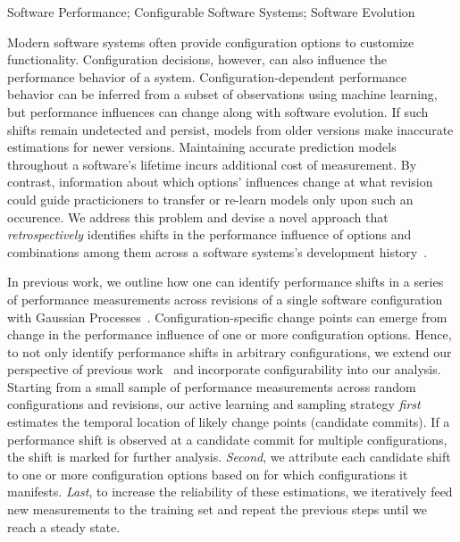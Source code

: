 \documentclass[utf8,biblatex]{lni}
\begin{document}
\begin{keywords}
Software Performance; Configurable Software Systems; Software Evolution
\end{keywords}

Modern software systems often provide configuration options to customize functionality. Configuration decisions, however, can also influence the performance behavior of a system. Configuration-dependent performance behavior can be inferred from a subset of observations using machine learning, but performance influences can change along with software evolution. If such shifts remain undetected and persist, models from older versions make inaccurate estimations for newer versions. Maintaining accurate prediction models throughout a software's lifetime incurs additional cost of measurement. By contrast, information about which options' influences change at what revision could guide practicioners to transfer or re-learn models only upon such an occurence. 
We address this problem and devise a novel approach that \textit{retrospectively} identifies shifts in the performance influence of options and combinations among them across a software systems’s development history~\cite{muehlbauer_identifying_2020}. 

In previous work, we outline how one can identify performance shifts in a series of performance measurements across revisions of a single software configuration with Gaussian Processes~\cite{muhlbauer_accurate_2019}. Configuration-specific change points can emerge from change in the performance influence of one or more configuration options. Hence, to not only identify performance shifts in arbitrary configurations, we extend our perspective of previous work~\cite{muhlbauer_accurate_2019} and incorporate  configurability into our analysis. 
Starting from a small sample of performance measurements across random configurations and revisions, our active learning and sampling strategy \textit{first} estimates the temporal location of likely change points (candidate commits). If a performance shift is observed at a candidate commit for multiple configurations, the shift is marked for further analysis. \textit{Second}, we attribute each candidate shift to one or more configuration options based on for which configurations it manifests. \textit{Last}, to increase the reliability of these estimations, we iteratively feed new measurements to the training set and repeat the previous steps until we reach a steady state.
	
\end{document}

